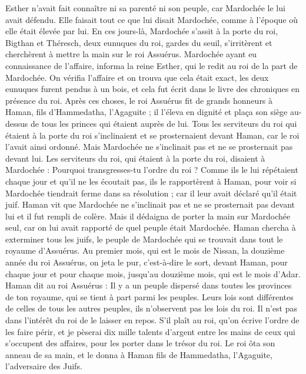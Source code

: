 \begin{multicols}{2}
Esther n’avait fait connaître ni sa parenté ni son peuple, car Mardochée le lui avait défendu. Elle faisait tout ce que lui disait Mardochée, comme à l’époque où elle était élevée par lui.
En ces jours-là, Mardochée s’assit à la porte du roi, Bigthan et Théresch, deux eunuques du roi, gardes du seuil, s’irritèrent et cherchèrent à mettre la main sur le roi Assuérus.
Mardochée ayant eu connaissance de l’affaire, informa la reine Esther, qui le redit au roi de la part de Mardochée.
On vérifia l’affaire et on trouva que cela était exact, les deux eunuques furent pendus à un bois, et cela fut écrit dans le livre des chroniques en présence du roi.
\VerseOne{}Après ces choses, le roi Assuérus fit de grands honneurs à Haman, fils d'Hammedatha, l’Agaguite ; il l'éleva en dignité et plaça son siège au-dessus de tous les princes qui étaient auprès de lui.
Tous les serviteurs du roi qui étaient à la porte du roi s'inclinaient et se prosternaient devant Haman, car le roi l’avait ainsi ordonné. Mais Mardochée ne s'inclinait pas et ne se prosternait pas devant lui.
Les serviteurs du roi, qui étaient à la porte du roi, disaient à Mardochée : Pourquoi transgresses-tu l’ordre du roi ?
Comme ils le lui répétaient chaque jour et qu'il ne les écoutait pas, ils le rapportèrent à Haman, pour voir si Mardochée tiendrait ferme dans sa résolution ; car il leur avait déclaré qu'il était juif.
Haman vit que Mardochée ne s'inclinait pas et ne se prosternait pas devant lui et il fut rempli de colère.
Mais il dédaigna de porter la main sur Mardochée seul, car on lui avait rapporté de quel peuple était Mardochée. Haman chercha à exterminer tous les juifs, le peuple de Mardochée qui se trouvait dans tout le royaume d'Assuérus.
Au premier mois, qui est le mois de Nissan, la douzième année du roi Assuérus, on jeta le pur, c'est-à-dire le sort, devant Haman, pour chaque jour et pour chaque mois, jusqu’au douzième mois, qui est le mois d'Adar.
Haman dit au roi Assuérus : Il y a un peuple dispersé dans toutes les provinces de ton royaume, qui se tient à part parmi les peuples. Leurs lois sont différentes de celles de tous les autres peuples, ils n’observent pas les lois du roi. Il n'est pas dans l’intérêt du roi de le laisser en repos.
S'il plaît au roi, qu'on écrive l’ordre de les faire périr, et je pèserai dix mille talents d'argent entre les mains de ceux qui s’occupent des affaires, pour les porter dans le trésor du roi.
Le roi ôta son anneau de sa main, et le donna à Haman fils de Hammedatha, l’Agaguite, l’adversaire des Juifs.

\end{multicols}

